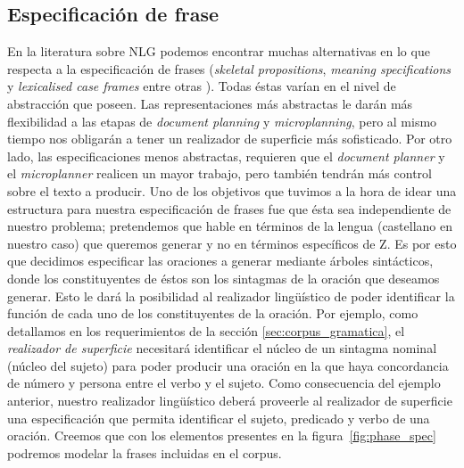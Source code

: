 \subsection{Especificación de frase}

En la literatura sobre NLG podemos encontrar muchas alternativas en lo que respecta a la especificación de frases (\textit{skeletal propositions}, \textit{meaning specifications} y \textit{lexicalised case frames} entre otras \cite{reiter_dale}). Todas éstas varían en el nivel de abstracción que poseen. Las representaciones más abstractas le darán más flexibilidad a las etapas de \textit{document planning} y \textit{microplanning}, pero al mismo tiempo nos obligarán a tener un realizador de superficie más sofisticado. Por otro lado, las especificaciones menos abstractas, requieren que el \textit{document planner} y el \textit{microplanner} realicen un mayor trabajo, pero también tendrán más control sobre el texto a producir. Uno de los objetivos que tuvimos a la hora de idear una estructura para nuestra especificación de frases fue que ésta sea independiente de nuestro problema; pretendemos que hable en términos de la lengua (castellano en nuestro caso) que queremos generar y no en términos específicos de Z. Es por esto que decidimos especificar las oraciones a generar mediante árboles sintácticos, donde los constituyentes de éstos son los sintagmas de la oración que deseamos generar. Esto le dará la posibilidad al realizador lingüístico de poder identificar la función de cada uno de los constituyentes de la oración. Por ejemplo, como detallamos en los requerimientos de la sección \ref{sec:corpus_gramatica}, el \emph{realizador de superficie} necesitará identificar el núcleo de un sintagma nominal (núcleo del sujeto) para poder producir una oración en la que haya concordancia de número y persona entre el verbo y el sujeto. Como consecuencia del ejemplo anterior, nuestro realizador lingüístico deberá proveerle al realizador de superficie una especificación que permita identificar el sujeto, predicado y verbo de una oración. Creemos que con los elementos presentes en la figura~\ref{fig:phase_spec} podremos modelar la frases incluidas en el corpus.

